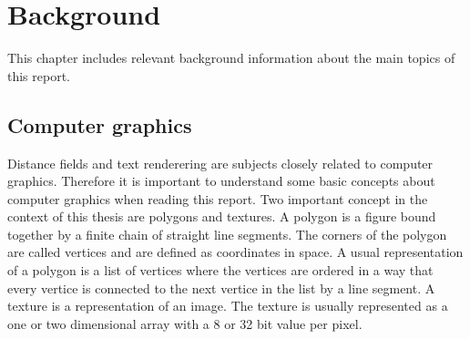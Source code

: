\chapter{Background}\label{cha:theory}
This chapter includes relevant background information about the main topics of this report. 
\section{Computer graphics}\label{computergraphics}
Distance fields and text renderering are subjects closely related to computer graphics. Therefore it is important to understand some basic concepts about computer graphics when reading this report. Two important concept in the context of this thesis are polygons and textures. A polygon is a figure bound together by a finite chain of straight line segments. The corners of the polygon are called vertices and are defined as coordinates in space. A usual representation of a polygon is a list of vertices where the vertices are ordered in a way that every vertice is connected to the next vertice in the list by a line segment. A texture is a representation of an image. The texture is usually represented as a one or two dimensional array with a 8 or 32 bit value per pixel. 

